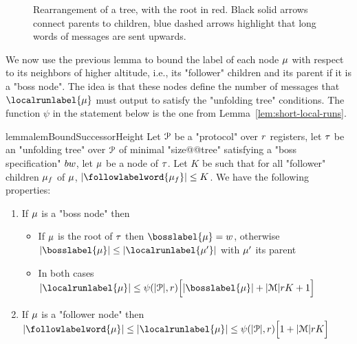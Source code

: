 \begin{figure}[h]
	
	\caption{Rearrangement of a tree, with the root in red. Black solid arrows connect parents to children, blue dashed arrows highlight that long words of messages are sent upwards.}
	\label{fig:rearrange-tree}
\end{figure}

We now use the previous lemma to bound the label of each node $\mu$ with respect to its neighbors of higher altitude, i.e., its "follower" children and its parent if it is a "boss node". The idea is that these nodes define the number of messages that $\localrunlabel{\node}$ must output to satisfy the "unfolding tree" conditions. The function $\psi$ in the statement below is the one from Lemma~\ref{lem:short-local-runs}.

\begin{restatable}{lemma}{lemBoundSuccessorHeight}
	\label{lem:bound-successor-height}
	Let $\mathcal{P}$ be a "protocol" over $r$ registers, let $\tau$ be an "unfolding tree" over $\mathcal{P}$ of minimal "size@@tree" satisfying a "boss specification" $\bossspec$, let $\mu$ be a node of $\tau$.
	Let $K$ be such that for all "follower" children $\mu_f$ of $\mu$, $\size{\followlabelword{\node_f}} \leq K$.
	We have the following properties:
	
	\begin{enumerate}				
		\item  If $\mu$ is a "boss node" then 
		\begin{itemize}
			\item If $\mu$ is the root of $\tau$ then $\bosslabel{\node} = w$, otherwise $\size{\bosslabel{\node}} \leq \size{\localrunlabel{\node'}}$ with $\mu'$ its parent
			
			\item In both cases $\size{\localrunlabel{\node}} \leq \towerfun(\size{\prot},r)\Big[ \size{\bosslabel{\node}} + \size{\messages}rK +1 \Big]$
		\end{itemize}
		
		\item If $\mu$ is a "follower node" then  $\size{\followlabelword{\node}} \leq \size{\localrunlabel{\node}} \leq \towerfun(\size{\prot},r)\Big[ 1 + \size{\messages}rK \Big]$
			
	\end{enumerate}
\end{restatable}

